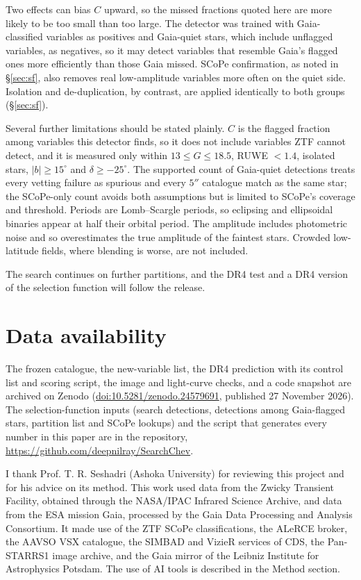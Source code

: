 \documentclass[twocolumn]{searchchev_preprint}
\begin{document}
Two effects can bias $C$ upward, so the missed fractions quoted here are more likely to be too small than too large.
The detector was trained with Gaia-classified variables as positives and Gaia-quiet stars, which include unflagged
variables, as negatives, so it may detect variables that resemble Gaia's flagged ones more efficiently than those
Gaia missed. SCoPe confirmation, as noted in \S\ref{sec:sf}, also removes real low-amplitude variables more often on the quiet side.
Isolation and de-duplication, by contrast, are applied identically to both groups (\S\ref{sec:sf}).

Several further limitations should be stated plainly. $C$ is the flagged fraction among variables this detector finds, so
it does not include variables ZTF cannot detect, and it is measured only within $13\le G\le18.5$, RUWE $<1.4$, isolated
stars, $|b|\ge15^\circ$ and $\delta\ge-25^\circ$. The supported count of Gaia-quiet detections treats every vetting failure
as spurious and every $5''$ catalogue match as the same star; the SCoPe-only count avoids both assumptions but is
limited to SCoPe's coverage and threshold. Periods are Lomb--Scargle periods, so eclipsing and ellipsoidal binaries
appear at half their orbital period. The amplitude includes photometric noise and so overestimates the true amplitude
of the faintest stars. Crowded low-latitude fields, where blending is worse, are not included.

The search continues on further partitions, and the DR4 test and a DR4 version of the selection function will follow
the release.

\section*{Data availability}
The frozen catalogue, the new-variable list, the DR4 prediction with its control list and scoring script, the image and
light-curve checks, and a code snapshot are archived on Zenodo (\href{https://doi.org/10.5281/zenodo.24579691}{doi:10.5281/zenodo.24579691},
published 27 November 2026). The selection-function inputs (search detections, detections among Gaia-flagged stars,
partition list and SCoPe lookups) and the script that generates every number in this paper are in the repository,
\url{https://github.com/deepnilray/SearchChev}.

\begin{acknowledgments}
I thank Prof. T. R. Seshadri (Ashoka University) for reviewing this project and for his advice on its method.
This work used data from the Zwicky Transient Facility, obtained through the NASA/IPAC Infrared Science Archive, and
data from the ESA mission Gaia, processed by the Gaia Data Processing and Analysis Consortium. It made use of the
ZTF SCoPe classifications, the ALeRCE broker, the AAVSO VSX catalogue, the SIMBAD and VizieR services of CDS, the
Pan-STARRS1 image archive, and the Gaia mirror of the Leibniz Institute for Astrophysics Potsdam. The use of AI tools
is described in the Method section.
\end{acknowledgments}
\end{document}
